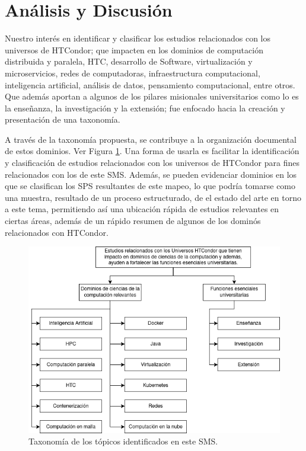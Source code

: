 \section{Análisis y Discusión}\label{sec:analisis-discusion}

Nuestro interés en identificar y clasificar los estudios relacionados con los universos de HTCondor; que impacten en los dominios de computación distribuida y paralela, HTC, desarrollo de Software, virtualización y microservicios, redes de computadoras, infraestructura computacional, inteligencia artificial, análisis de datos, pensamiento computacional, entre otros. Que además aportan a algunos de los pilares misionales universitarios como lo es la enseñanza, la investigación y la extensión; fue enfocado hacia la creación y presentación de una taxonomía.

A través de la taxonomía propuesta, se contribuye a la organización documental de estos dominios. Ver Figura \ref{fig:taxonomia}. Una forma de usarla es facilitar la identificación y clasificación de estudios relacionados con los universos de HTCondor para fines relacionados con los de este SMS. Además, se pueden evidenciar dominios en los que se clasifican los SPS resultantes de este mapeo, lo que podría tomarse como una muestra, resultado de un proceso estructurado, de el estado del arte en torno a este tema, permitiendo así una ubicación rápida de estudios relevantes en ciertas áreas, además de un rápido resumen de algunos de los dominós relacionados con HTCondor.

\begin{figure}[htbp]
	\centering
	\vspace{10pt}
	\includegraphics[scale=0.4]{resources/figures/sms-taxonomia.drawio.png}
	\vspace{6pt}
	\caption{Taxonomía de los tópicos identificados en este SMS.}
	\label{fig:taxonomia}
\end{figure}
